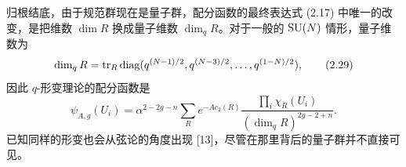 归根结底，由于规范群现在是量子群，配分函数的最终表达式 (2.17) 中唯一的改变，是把维数
$\dim R$ 换成量子维数 $\dim_qR$。对于一般的 $\mathrm{SU}(N)$ 情形，量子维数为
\begin{equation}
  \dim_qR=\operatorname{tr}_R\operatorname{diag}(q^{(N-1)/2},q^{(N-3)/2},\dots,q^{(1-N)/2}),
  \tag{2.29}
\end{equation}
因此 $q$-形变理论的配分函数是
\begin{equation}
  \psi_{A,g}(U_i)=\alpha^{2-2g-n}\sum_R e^{-Ac_2(R)}
  \frac{\prod_i\chi_R(U_i)}{(\dim_qR)^{2g-2+n}}.
  \tag{2.30}
\end{equation}
已知同样的形变也会从弦论的角度出现 [13]，尽管在那里背后的量子群并不直接可见。
